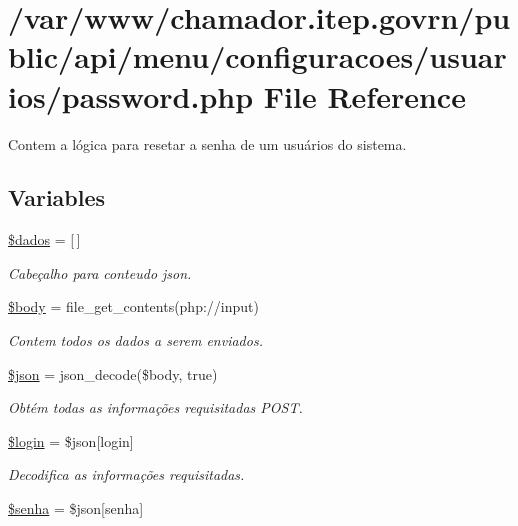\hypertarget{password_8php}{}\section{/var/www/chamador.itep.\+govrn/public/api/menu/configuracoes/usuarios/password.php File Reference}
\label{password_8php}


Contem a lógica para resetar a senha de um usuários do sistema.  


\subsection*{Variables}
\begin{DoxyCompactItemize}
\item 
\hyperlink{password_8php_a252370d95039a38fa11afab784725d58}{\$dados} = \mbox{[}$\,$\mbox{]}
\begin{DoxyCompactList}\small\item\em Cabeçalho para conteudo json. \end{DoxyCompactList}\item 
\hyperlink{password_8php_a26b9f9373f7bb79dfcf8a86dff086b45}{\$body} = file\+\_\+get\+\_\+contents(\textquotesingle{}php\+://input\textquotesingle{})
\begin{DoxyCompactList}\small\item\em Contem todos os dados a serem enviados. \end{DoxyCompactList}\item 
\hyperlink{password_8php_acedd13b51401130848ce18f4d5c52605}{\$json} = json\+\_\+decode(\$body, true)
\begin{DoxyCompactList}\small\item\em Obtém todas as informações requisitadas P\+O\+ST. \end{DoxyCompactList}\item 
\hyperlink{password_8php_afc31993e855f9631572adfedcfe6f34b}{\$login} = \$json\mbox{[}\textquotesingle{}login\textquotesingle{}\mbox{]}
\begin{DoxyCompactList}\small\item\em Decodifica as informações requisitadas. \end{DoxyCompactList}\item 
\hyperlink{password_8php_a3678c8769c9698fd30581c1016c5f475}{\$senha} = \$json\mbox{[}\textquotesingle{}senha\textquotesingle{}\mbox{]}

\end{DoxyCompactItemize}
